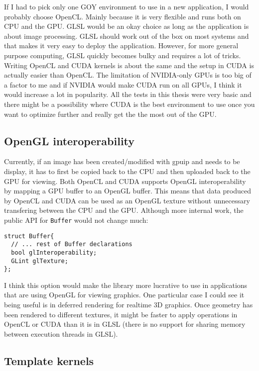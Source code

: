 If I had to pick only one GOY environment to use in a new application, I would probably choose OpenCL. Mainly because it is very flexible and runs both on CPU and the GPU. GLSL would be an okay choice as long as the application is about image processing. GLSL should work out of the box on most systems and that makes it very easy to deploy the application. However, for more general purpose computing, GLSL quickly becomes bulky and requires a lot of tricks. Writing OpenCL and CUDA kernels is about the same and the setup in CUDA is actually easier than OpenCL. The limitation of NVIDIA-only GPUs is too big of a factor to me and if NVIDIA would make CUDA run on all GPUs, I think it would increase a lot in popularity. All the tests in this thesis were very basic and there might be a possibility where CUDA is the best environment to use once you want to optimize further and really get the the most out of the GPU.

\subsection{OpenGL interoperability}

Currently, if an image has been created/modified with gpuip and needs to be display, it has to first be copied back to the CPU and then uploaded back to the GPU for viewing. Both OpenCL and CUDA supports OpenGL interoperability by mapping a GPU buffer to an OpenGL buffer. This means that data produced by OpenCL and CUDA can be used as an OpenGL texture without unnecessary transfering between the CPU and the GPU. Although more internal work, the public API for {\tt Buffer} would not change much:
\newline
\renewcommand{\lstlistingname}{Code}
\begin{lstlisting}[caption= gpuip OpenGL interoperability, label=glinter]
struct Buffer{
  // ... rest of Buffer declarations 
  bool glInteroperability;
  GLint glTexture;
};
\end{lstlisting}

I think this option would make the library more lucrative to use in applications that are using OpenGL for viewing graphics. One particular case I could see it being useful is in deferred rendering for realtime 3D graphics. Once geometry has been rendered to different textures, it might be faster to apply operations in OpenCL or CUDA than it is in GLSL (there is no support for sharing memory between execution threads in GLSL).

\subsection{Template kernels}

